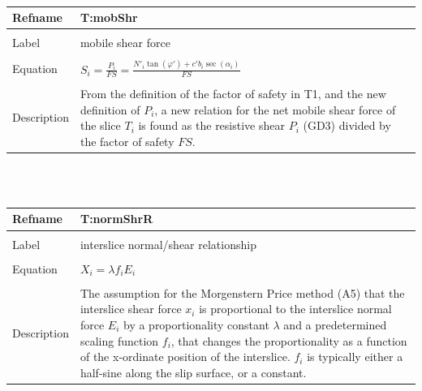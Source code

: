 \documentclass[12pt]{article}
\begin{document}
~\newline
\noindent \begin{minipage}{\textwidth}
\begin{tabular}{p{} p{}}
\toprule \textbf{Refname} & \textbf{T:mobShr}
\label{T:mobShr}
\\ \midrule \\
Label & mobile shear force
\\ \midrule \\
Equation & $S_{i}=\frac{P_{i}}{FS}=\frac{N'_{i}\tan\left(\varphi{}'\right)+c'b_{i}\sec\left(\alpha{}_{i}\right)}{FS}$
\\ \midrule \\
Description & From the definition of the factor of safety in T1, and the new definition of $P_{i}$, a new relation for the net mobile shear force of the slice $T_{i}$ is found as the resistive shear $P_{i}$ (GD3) divided by the factor of safety $FS$.
\\ \bottomrule \end{tabular}
\end{minipage}\\
~\newline
\noindent \begin{minipage}{\textwidth}
\begin{tabular}{p{} p{}}
\toprule \textbf{Refname} & \textbf{T:normShrR}
\label{T:normShrR}
\\ \midrule \\
Label & interslice normal/shear relationship
\\ \midrule \\
Equation & $X_{i}=\lambda{}f_{i}E_{i}$
\\ \midrule \\
Description & The assumption for the Morgenstern Price method (A5) that the interslice shear force $x_{i}$ is proportional to the interslice normal force $E_{i}$ by a proportionality constant $\lambda{}$ and a predetermined scaling function $f_{i}$, that changes the proportionality as a function of the x-ordinate position of the interslice. $f_{i}$ is typically either a half-sine along the slip surface, or a constant.
\\ \bottomrule \end{tabular}
\end{minipage}\\
~\newline
\end{document}
